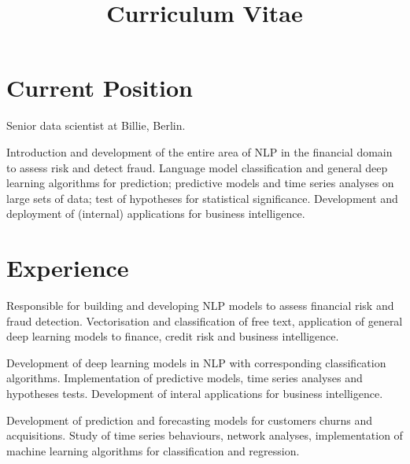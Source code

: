 \documentclass[11pt,a4paper,sans]{moderncv}
\title{Curriculum Vitae}
\begin{document}
 \makecvtitle %


\section{Current Position} Senior data scientist at Billie, Berlin.

\bigskip Introduction and development of the entire area of NLP in the
financial domain to assess risk and detect fraud. Language model classification and general
deep learning algorithms for prediction; predictive models and time series
analyses on large sets of data; test of hypotheses for statistical significance.
Development and deployment of (internal) applications for business intelligence.

\section{Experience}
 {
Responsible for building and developing NLP
models to assess financial risk and fraud detection.  Vectorisation and
classification of free text, application of general deep learning models to
finance, credit risk and business intelligence.}

 {
Development of deep learning models in NLP with corresponding classification algorithms.
Implementation of predictive models, time series analyses and hypotheses tests. Development of
interal applications for business intelligence.}

 {Development
of prediction and forecasting models for customers churns and acquisitions.
Study of time series behaviours, network analyses, implementation of machine
learning algorithms for classification and regression.}


\end{document}
